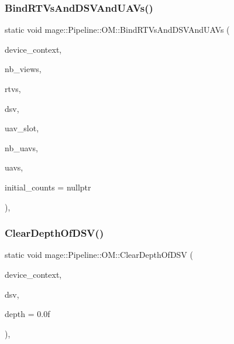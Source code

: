\subsubsection{\texorpdfstring{Bind\+R\+T\+Vs\+And\+D\+S\+V\+And\+U\+A\+Vs()}{BindRTVsAndDSVAndUAVs()}}
{\footnotesize\ttfamily static void mage\+::\+Pipeline\+::\+O\+M\+::\+Bind\+R\+T\+Vs\+And\+D\+S\+V\+And\+U\+A\+Vs (\begin{DoxyParamCaption}\item[{I\+D3\+D11\+Device\+Context2 $\ast$}]{device\+\_\+context,  }\item[{\hyperlink{namespacemage_a41c104c036fba3756a74e19f793eeaa1}{U32}}]{nb\+\_\+views,  }\item[{I\+D3\+D11\+Render\+Target\+View $\ast$const $\ast$}]{rtvs,  }\item[{I\+D3\+D11\+Depth\+Stencil\+View $\ast$}]{dsv,  }\item[{\hyperlink{namespacemage_a41c104c036fba3756a74e19f793eeaa1}{U32}}]{uav\+\_\+slot,  }\item[{\hyperlink{namespacemage_a41c104c036fba3756a74e19f793eeaa1}{U32}}]{nb\+\_\+uavs,  }\item[{I\+D3\+D11\+Unordered\+Access\+View $\ast$const $\ast$}]{uavs,  }\item[{const \hyperlink{namespacemage_a41c104c036fba3756a74e19f793eeaa1}{U32} $\ast$}]{initial\+\_\+counts = {\ttfamily nullptr} }\end{DoxyParamCaption})\hspace{0.3cm}{\ttfamily [static]}, {\ttfamily [noexcept]}}

\hypertarget{structmage_1_1_pipeline_1_1_o_m_a462b6c0240410ca05bc04097b69564bf}{}\label{structmage_1_1_pipeline_1_1_o_m_a462b6c0240410ca05bc04097b69564bf} 
\subsubsection{\texorpdfstring{Clear\+Depth\+Of\+D\+S\+V()}{ClearDepthOfDSV()}}
{\footnotesize\ttfamily static void mage\+::\+Pipeline\+::\+O\+M\+::\+Clear\+Depth\+Of\+D\+SV (\begin{DoxyParamCaption}\item[{I\+D3\+D11\+Device\+Context2 $\ast$}]{device\+\_\+context,  }\item[{I\+D3\+D11\+Depth\+Stencil\+View $\ast$}]{dsv,  }\item[{\hyperlink{namespacemage_aa97e833b45f06d60a0a9c4fc22ae02c0}{F32}}]{depth = {\ttfamily 0.0f} }\end{DoxyParamCaption})\hspace{0.3cm}{\ttfamily [static]}, {\ttfamily [noexcept]}}

